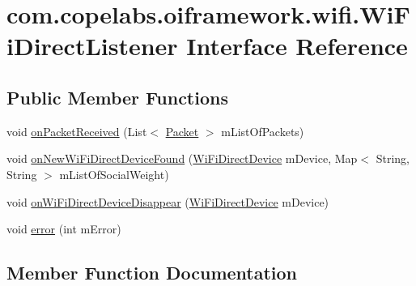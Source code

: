 \hypertarget{interfacecom_1_1copelabs_1_1oiframework_1_1wifi_1_1_wi_fi_direct_listener}{}\section{com.\+copelabs.\+oiframework.\+wifi.\+Wi\+Fi\+Direct\+Listener Interface Reference}
\label{interfacecom_1_1copelabs_1_1oiframework_1_1wifi_1_1_wi_fi_direct_listener}
\subsection*{Public Member Functions}
\begin{DoxyCompactItemize}
\item 
void \hyperlink{interfacecom_1_1copelabs_1_1oiframework_1_1wifi_1_1_wi_fi_direct_listener_ab02f5ae14a0bab182bcfd6d0c226cfd6}{on\+Packet\+Received} (List$<$ \hyperlink{classcom_1_1copelabs_1_1oiframework_1_1contentmanager_1_1_packet}{Packet} $>$ m\+List\+Of\+Packets)
\item 
void \hyperlink{interfacecom_1_1copelabs_1_1oiframework_1_1wifi_1_1_wi_fi_direct_listener_a1ac8d66511dc1152ffd9d404c2acb66a}{on\+New\+Wi\+Fi\+Direct\+Device\+Found} (\hyperlink{classcom_1_1copelabs_1_1oiframework_1_1wifi_1_1_wi_fi_direct_device}{Wi\+Fi\+Direct\+Device} m\+Device, Map$<$ String, String $>$ m\+List\+Of\+Social\+Weight)
\item 
void \hyperlink{interfacecom_1_1copelabs_1_1oiframework_1_1wifi_1_1_wi_fi_direct_listener_a119dc7b314e02166bfeeb6b45f9b6a51}{on\+Wi\+Fi\+Direct\+Device\+Disappear} (\hyperlink{classcom_1_1copelabs_1_1oiframework_1_1wifi_1_1_wi_fi_direct_device}{Wi\+Fi\+Direct\+Device} m\+Device)
\item 
void \hyperlink{interfacecom_1_1copelabs_1_1oiframework_1_1wifi_1_1_wi_fi_direct_listener_a1c2013553cc66064055c1015f59a7198}{error} (int m\+Error)
\end{DoxyCompactItemize}


\subsection{Member Function Documentation}
\hypertarget{interfacecom_1_1copelabs_1_1oiframework_1_1wifi_1_1_wi_fi_direct_listener_a1c2013553cc66064055c1015f59a7198}{}
